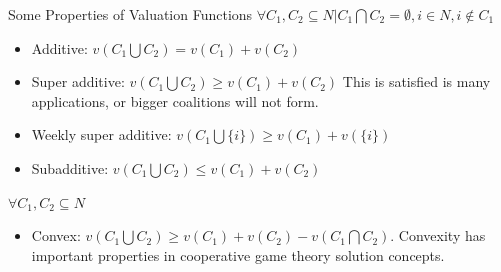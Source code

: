\documentclass{beamer}
\begin{document}
\begin{frame}{Some Properties of Valuation Functions}
    $\forall C_1,C_2 \subseteq N | C_1 \bigcap C_2 = \emptyset, i \in N, i \notin C_1$
    \begin{itemize}
        \item {\color{blue} Additive:} $v(C_1 \bigcup C_2) = v(C_1) + v(C_2)$
        \item {\color{blue} Super additive:} $v(C_1 \bigcup C_2) \geq v(C_1) + v(C_2)$ This is satisfied is many applications, or bigger coalitions will not form.
        \item {\color{blue} Weekly super additive:} $v(C_1 \bigcup \{i\}) \geq v(C_1) + v(\{i\})$
        \item {\color{red} Subadditive:} $v(C_1 \bigcup C_2) \leq v(C_1) + v(C_2)$
    \end{itemize}

    $\forall C_1,C_2 \subseteq N$
    \begin{itemize}
        \item {\color{blue} Convex:} $v(C_1 \bigcup C_2) \geq v(C_1) + v(C_2) - v(C_1 \bigcap C_2)$. Convexity has important properties in cooperative game theory solution concepts.
    \end{itemize}
\end{frame}
\end{document}
